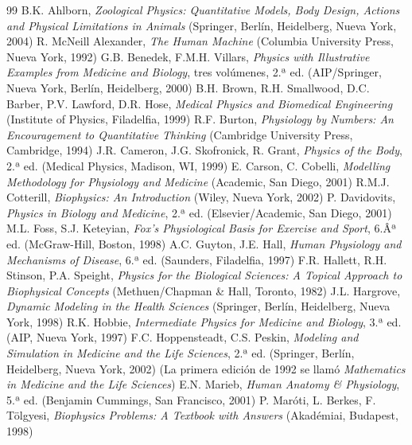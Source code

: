 ﻿\documentclass{book}
\begin{document}
\vspace{2em}
\begin{thebibliography}{99}
 B.K. Ahlborn, \textit{Zoological Physics: Quantitative Models, Body Design, Actions and Physical Limitations in Animals} (Springer, Berlín, Heidelberg, Nueva York, 2004)
 R. McNeill Alexander, \textit{The Human Machine} (Columbia University Press, Nueva York, 1992)
 G.B. Benedek, F.M.H. Villars, \textit{Physics with Illustrative Examples from Medicine and Biology}, tres volúmenes, 2.ª ed. (AIP/Springer, Nueva York, Berlín, Heidelberg, 2000)
 B.H. Brown, R.H. Smallwood, D.C. Barber, P.V. Lawford, D.R. Hose, \textit{Medical Physics and Biomedical Engineering} (Institute of Physics, Filadelfia, 1999)
 R.F. Burton, \textit{Physiology by Numbers: An Encouragement to Quantitative Thinking} (Cambridge University Press, Cambridge, 1994)
 J.R. Cameron, J.G. Skofronick, R. Grant, \textit{Physics of the Body}, 2.ª ed. (Medical Physics, Madison, WI, 1999)
 E. Carson, C. Cobelli, \textit{Modelling Methodology for Physiology and Medicine} (Academic, San Diego, 2001)
 R.M.J. Cotterill, \textit{Biophysics: An Introduction} (Wiley, Nueva York, 2002)
 P. Davidovits, \textit{Physics in Biology and Medicine}, 2.ª ed. (Elsevier/Academic, San Diego, 2001)
 M.L. Foss, S.J. Keteyian, \textit{Fox's Physiological Basis for Exercise and Sport}, 6.Âª ed. (McGraw-Hill, Boston, 1998)
 A.C. Guyton, J.E. Hall, \textit{Human Physiology and Mechanisms of Disease}, 6.ª ed. (Saunders, Filadelfia, 1997)
 F.R. Hallett, R.H. Stinson, P.A. Speight, \textit{Physics for the Biological Sciences: A Topical Approach to Biophysical Concepts} (Methuen/Chapman \& Hall, Toronto, 1982)
 J.L. Hargrove, \textit{Dynamic Modeling in the Health Sciences} (Springer, Berlín, Heidelberg, Nueva York, 1998)
 R.K. Hobbie, \textit{Intermediate Physics for Medicine and Biology}, 3.ª ed. (AIP, Nueva York, 1997)
 F.C. Hoppensteadt, C.S. Peskin, \textit{Modeling and Simulation in Medicine and the Life Sciences}, 2.ª ed. (Springer, Berlín, Heidelberg, Nueva York, 2002) (La primera edición de 1992 se llamó \textit{Mathematics in Medicine and the Life Sciences})
 E.N. Marieb, \textit{Human Anatomy \& Physiology}, 5.ª ed. (Benjamin Cummings, San Francisco, 2001)
 P. Maróti, L. Berkes, F. Tölgyesi, \textit{Biophysics Problems: A Textbook with Answers} (Akadémiai, Budapest, 1998)

\end{thebibliography}
\end{document}
